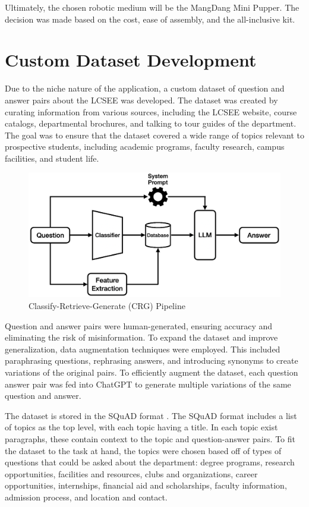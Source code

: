 \documentclass[conference]{IEEEtran}
\begin{document}
Ultimately, the chosen robotic medium will be the MangDang Mini Pupper. 
The decision was made based on the cost, ease of assembly, and the all-inclusive kit.

\section{Custom Dataset Development}
Due to the niche nature of the application, a custom dataset of question and answer pairs about the LCSEE was developed.
The dataset was created by curating information from various sources, including the LCSEE website, course catalogs, departmental brochures, and talking to tour guides of the department. 
The goal was to ensure that the dataset covered a wide range of topics relevant to prospective students, including academic programs, faculty research, campus facilities, and student life.

\begin{figure}[t]
    \centering
    \includegraphics[width=0.60\linewidth]{assets/crg_diagram.png}
    \caption{Classify-Retrieve-Generate (CRG) Pipeline}
    \label{fig:crg_flow}
\end{figure}

Question and answer pairs were human-generated, ensuring accuracy and eliminating the risk of misinformation.
To expand the dataset and improve generalization, data augmentation techniques were employed.
This included paraphrasing questions, rephrasing answers, and introducing synonyms to create variations of the original pairs.
To efficiently augment the dataset, each question answer pair was fed into ChatGPT to generate multiple variations of the same question and answer.

The dataset is stored in the SQuAD format \cite{b7}. 
The SQuAD format includes a list of topics as the top level, with each topic having a title. 
In each topic exist paragraphs, these contain context to the topic and question-answer pairs.
To fit the dataset to the task at hand, the topics were chosen based off of types of questions that could be asked about the department:
degree programs, research opportunities, facilities and resources, clubs and organizations, career opportunities, internships, financial aid and scholarships, faculty information, admission process, and location and contact.
\end{document}
